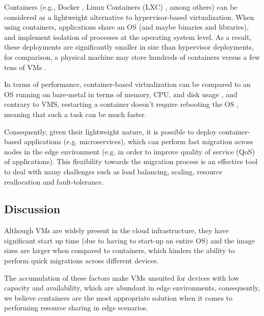 Containers (e.g., Docker \cite{docker}, Linux Containers (LXC) \cite{lxc}, among others) can be considered as a lightweight alternative to hypervisor-based virtualization. When using containers, applications share an OS (and maybe binaries and libraries), and implement isolation of processes at the operating system level. As a result, these deployments are significantly smaller in size than hypervisor deployments, for comparison, a physical machine may store hundreds of containers versus a few tens of VMs \cite{7036275}.  

In terms of performance, container-based virtualization can be compared to an OS running on bare-metal in terms of memory, CPU, and disk usage \cite{preeth2015evaluation}, and contrary to VMS, restarting a container doesn't require rebooting the OS \cite{7036275}, meaning that such a task can be much faster.

Consequently, given their lightweight nature, it is possible to deploy container-based applications (e.g. microservices), which can perform fast migration across nodes in the edge environment (e.g. in order to improve quality of service (QoS) of applications). This flexibility towards the migration process is an effective tool to deal with many challenges such as load balancing, scaling, resource reallocation and fault-tolerance. 

\subsection{Discussion}

Although VMs are widely present in the cloud infrastructure, they have significant start up time (due to having to start-up an entire OS) and the image sizes are larger when compared to containers, which hinders the ability to perform quick migrations across different devices. 

The accumulation of these factors make VMs unsuited for devices with low capacity and availability, which are abundant in edge environments, consequently, we believe containers are the most appropriate solution when it comes to performing resource sharing in edge scenarios. 